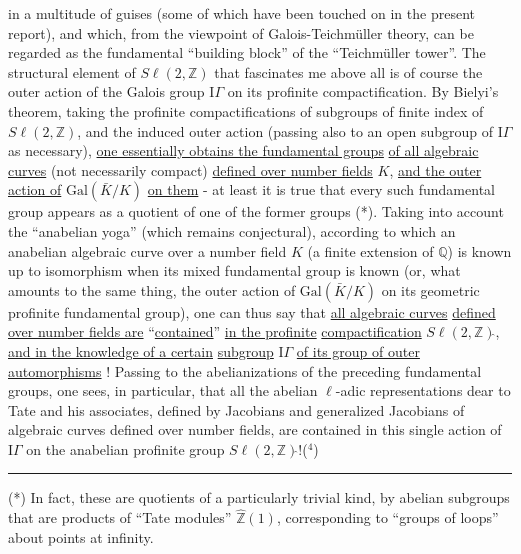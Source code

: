 
in a multitude of guises (some of which have been touched on
in the present report), and which, from the viewpoint of
Galois-Teichmüller theory, can be regarded as the fundamental
``building block'' of the ``Teichmüller tower''. The structural
element of $S\ell(2,\mathbb{Z})$ that fascinates me above all is of course
the outer action of the Galois group $\mathrm{I}\!\Gamma$ on its profinite
compactification. By Bielyi's theorem, taking the profinite
compactifications of subgroups of finite index of $S\ell(2,\mathbb{Z})$, and the induced
outer action (passing also to an open subgroup of $\mathrm{I}\!\Gamma$
as necessary), \uline{one essentially obtains the fundamental groups}
\uline{of all algebraic curves} (not necessarily compact)
\uline{defined over number fields} $K$, \uline{and the outer action of}
$\mathrm{Gal}(\bar{K}/K)$ \uline{on them} - at least it is true that every such fundamental
group appears as a quotient of one of the former groups (*).
Taking into account the ``anabelian yoga'' (which remains conjectural),
according to which an anabelian algebraic curve over a number field $K$
(a finite extension of $\mathbb{Q}$) is known up to isomorphism when
its mixed fundamental group is known (or, what amounts to the same thing,
the outer action of $\mathrm{Gal}(\bar{K}/K)$ on its geometric profinite
fundamental group), one can thus say that \uline{all algebraic curves}
\uline{defined over number fields are} ``\uline{contained}'' \uline{in the profinite}
\uline{compactification} $S\ell(2,\mathbb{Z})\hat{}$, \uline{and in the knowledge of a certain}
\uline{subgroup} $\mathrm{I}\!\Gamma$ \uline{of its group of outer automorphisms} !
Passing to the abelianizations of the preceding fundamental groups, one sees,
in particular, that all the abelian $\ell$-adic representations dear
to Tate and his associates, defined by Jacobians and generalized
Jacobians of algebraic curves defined over number fields,
are contained in this single action of $\mathrm{I}\!\Gamma$ on the anabelian profinite
group $S\ell(2,\mathbb{Z})\hat{}$!($^{4}$)

\rule{5cm}{0.4pt}

(*) In fact, these are quotients of a particularly trivial
kind, by abelian subgroups that are products of ``Tate modules''
$\hat{\mathbb{Z}}(1)$, corresponding to ``groups of loops'' about points at infinity.


